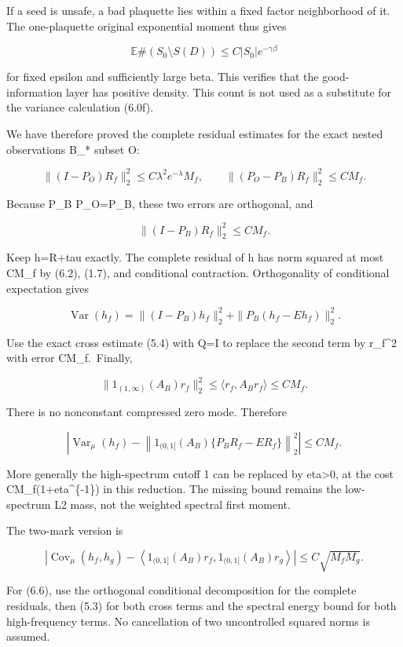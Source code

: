 \documentclass[
  11pt,
]{article}
\begin{document}
If a seed is unsafe, a bad plaquette lies within a fixed factor
neighborhood of it. The one-plaquette original exponential moment thus
gives

\[
 \mathbb E\#(S_0\setminus S(D))
 \le C|S_0|e^{-\gamma\beta}
 \tag{6.0g}
\]

for fixed epsilon and sufficiently large beta. This verifies that the
good-information layer has positive density. This count is not used as a
substitute for the variance calculation (6.0f).

We have therefore proved the complete residual estimates for the exact
nested observations B\_* subset O:

\[
 \|(I-P_O)R_f\|_2^2\le C\lambda^2e^{-\lambda}M_f,
 \qquad
 \|(P_O-P_B)R_f\|_2^2\le CM_f.
 \tag{6.1}
\]

Because P\_B P\_O=P\_B, these two errors are orthogonal, and

\[
 \|(I-P_B)R_f\|_2^2\le CM_f.
 \tag{6.2}
\]

Keep h=R+tau exactly. The complete residual of h has norm squared at
most CM\_f by (6.2), (1.7), and conditional contraction. Orthogonality
of conditional expectation gives

\[
 \operatorname{Var}(h_f)
 =\|(I-P_B)h_f\|_2^2+
   \|P_B(h_f-Eh_f)\|_2^2.
 \tag{6.3}
\]

Use the exact cross estimate (5.4) with Q=I to replace the second term
by \textbar\textbar r\_f\textbar\textbar\^{}2 with error CM\_f.~Finally,

\[
 \|1_{(1,\infty)}(A_B)r_f\|_2^2
 \le\langle r_f,A_Br_f\rangle\le CM_f.
 \tag{6.4}
\]

There is no nonconstant compressed zero mode. Therefore

\[
 \boxed{\quad
 \left|\operatorname{Var}_\mu(h_f)
 -\left\|1_{(0,1]}(A_B)
     \{P_BR_f-ER_f\}\right\|_2^2\right|
 \le CM_f.
 \quad}
 \tag{6.5}
\]

More generally the high-spectrum cutoff 1 can be replaced by
eta\textgreater0, at the cost CM\_f(1+eta\^{}\{-1\}) in this reduction.
The missing bound remains the low-spectrum L2 mass, not the weighted
spectral first moment.

The two-mark version is

\[
 \left|\operatorname{Cov}_\mu(h_f,h_g)
 -\left\langle1_{(0,1]}(A_B)r_f,
                 1_{(0,1]}(A_B)r_g\right\rangle\right|
 \le C\sqrt{M_fM_g}.
 \tag{6.6}
\]

For (6.6), use the orthogonal conditional decomposition for the complete
residuals, then (5.3) for both cross terms and the spectral energy bound
for both high-frequency terms. No cancellation of two uncontrolled
squared norms is assumed.
\end{document}
